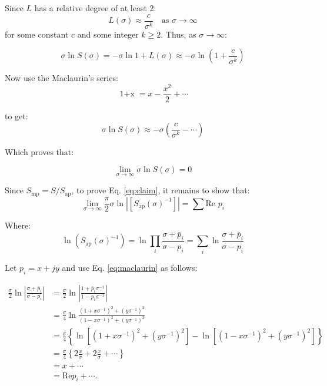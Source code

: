 \documentclass{scrreprt}
\begin{document}
Since $L$ has a relative degree of at least 2:
\begin{equation}
    L(\sigma)\approx \frac{c}{\sigma^k} \quad \text{as }  \sigma \rightarrow \infty
\end{equation}
for some constant $c$ and some integer $k\geq2$. Thus, as $\sigma\rightarrow \infty$:

\begin{equation}
    \sigma\operatorname{ln}{S(\sigma)}=-\sigma\operatorname{ln}{1+L(\sigma)}\approx-\sigma\operatorname{ln}{\left(1+\frac{c}{\sigma^k}\right)}
\end{equation}

Now use the Maclaurin's series:
\begin{equation}
    \operatorname{1+x}=x-\frac{x^2}{2}+\dotsi
    \label{eq:maclaurin}
\end{equation}

to get:
\begin{equation}
    \sigma\operatorname{ln}{S(\sigma)}\approx-\sigma\left(\frac{c}{\sigma^k}-\dotsi \right)
\end{equation}

Which proves that:

\begin{equation}
    \lim_{\sigma\rightarrow\infty}{\sigma\operatorname{ln}{S(\sigma)}}=0
\end{equation}

Since $S_\text{mp}=S/S_\text{ap}$, to prove Eq. \ref{eq:claim}, it remains to show that:
\begin{equation}
    \lim_{\sigma\rightarrow \infty}{\frac{\pi}{2} \sigma \operatorname{ln}\left|\left[S_\text{ap}(\sigma)^{-1}\right]\right|}=\sum\text{Re }p_i
\end{equation}

Where:
\begin{equation}
    \operatorname{ln}{(S_\text{ap}(\sigma)^{-1})}=\operatorname{ln}{\prod_i{\frac{\sigma+\bar{p}_i}{\sigma-p_i}}}=\sum_i{\operatorname{ln}{\frac{\sigma+\bar{p}_i}{\sigma-p_i}}}
    \label{eq:last_claim}
\end{equation}

Let $p_i=x+jy$ and use Eq. \ref{eq:maclaurin} as follows:

\begin{align}
    \frac{\sigma}{2} \ln \left| \frac{\sigma + \bar{p}_i}{\sigma - p_i} \right| 
    &= \frac{\sigma}{2} \ln \left| \frac{1 + \bar{p}_i \sigma^{-1}}{1 - p_i \sigma^{-1}} \right| \\
    &= \frac{\sigma}{4} \ln \frac{(1 + x\sigma^{-1})^2 + (y\sigma^{-1})^2}{(1 - x\sigma^{-1})^2 + (y\sigma^{-1})^2} \\
    &= \frac{\sigma}{4} \left\{ \ln[(1 + x\sigma^{-1})^2 + (y\sigma^{-1})^2] - \ln[(1 - x\sigma^{-1})^2 + (y\sigma^{-1})^2] \right\} \\
    &= \frac{\sigma}{4} \left\{ 2\frac{x}{\sigma} + 2\frac{x}{\sigma} + \cdots \right\} \\
    &= x + \cdots \\
    &= \text{Re} p_i + \cdots.
\end{align}
\end{document}
